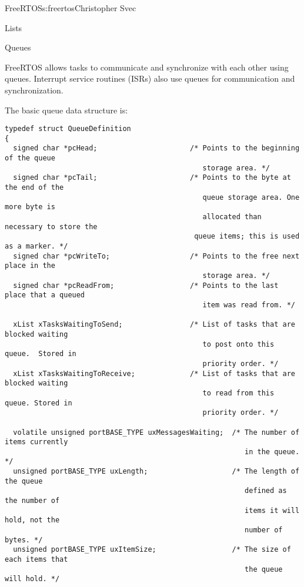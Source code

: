 \begin{aosachapter}{FreeRTOS}{s:freertos}{Christopher Svec}
\begin{aosasect1}{Lists}
\end{aosasect1}

\begin{aosasect1}{Queues}


FreeRTOS allows tasks to communicate and synchronize with each other
using queues.  Interrupt service routines (ISRs) also use queues for
communication and synchronization.

The basic queue data structure is:

\begin{verbatim}
typedef struct QueueDefinition
{
  signed char *pcHead;                      /* Points to the beginning of the queue 
                                               storage area. */
  signed char *pcTail;                      /* Points to the byte at the end of the 
                                               queue storage area. One more byte is 
                                               allocated than necessary to store the 
                                             queue items; this is used as a marker. */
  signed char *pcWriteTo;                   /* Points to the free next place in the 
                                               storage area. */
  signed char *pcReadFrom;                  /* Points to the last place that a queued 
                                               item was read from. */
                                           
  xList xTasksWaitingToSend;                /* List of tasks that are blocked waiting 
                                               to post onto this queue.  Stored in 
                                               priority order. */
  xList xTasksWaitingToReceive;             /* List of tasks that are blocked waiting 
                                               to read from this queue. Stored in 
                                               priority order. */

  volatile unsigned portBASE_TYPE uxMessagesWaiting;  /* The number of items currently
                                                         in the queue. */
  unsigned portBASE_TYPE uxLength;                    /* The length of the queue 
                                                         defined as the number of 
                                                         items it will hold, not the 
                                                         number of bytes. */
  unsigned portBASE_TYPE uxItemSize;                  /* The size of each items that 
                                                         the queue will hold. */
                                         

\end{verbatim}
\end{aosasect1}
\end{aosachapter}
